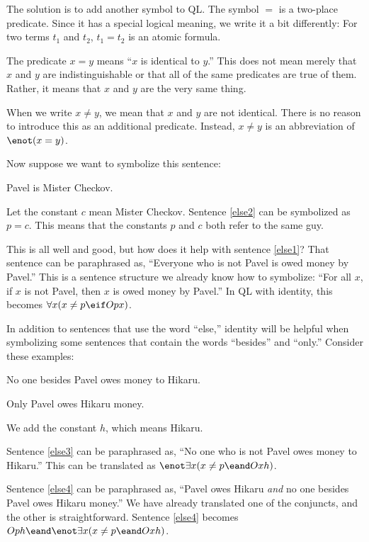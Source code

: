 The solution is to add another symbol to QL. The symbol $=$ is a two-place predicate. Since it has a special logical meaning, we write it a bit differently: For two terms $t_1$ and $t_2$, $t_1=t_2$ is an atomic formula.

The predicate $x=y$ means ``$x$ is identical to $y$.'' This does not mean merely that $x$ and $y$ are indistinguishable or that all of the same predicates are true of them. Rather, it means that $x$ and $y$ are the very same thing.

When we write $x \neq y$, we mean that $x$ and $y$ are not identical. There is no reason to introduce this as an additional predicate. Instead, $x \neq y$ is an abbreviation of $\enot(x = y)$.

Now suppose we want to symbolize this sentence:
\begin{kormanize}
\item[\ex{else2}] Pavel is Mister Checkov.
\end{kormanize}
Let the constant $c$ mean Mister Checkov. Sentence \ref{else2} can be symbolized as $p=c$. This means that the constants $p$ and $c$ both refer to the same guy.

This is all well and good, but how does it help with sentence \ref{else1}? That sentence can be paraphrased as, ``Everyone who is not Pavel is owed money by Pavel.'' This is a sentence structure we already know how to symbolize: ``For all $x$, if $x$ is not Pavel, then $x$ is owed money by Pavel.'' In QL with identity, this becomes $\forall x (x\neq p \eif Opx)$.

In addition to sentences that use the word ``else,'' identity will be helpful when symbolizing some sentences that contain the words ``besides'' and ``only.'' Consider these examples:

\begin{kormanize}
\item[\ex{else3}] No one besides Pavel owes money to Hikaru.
\item[\ex{else4}] Only Pavel owes Hikaru money.
\end{kormanize}

We add the constant $h$, which means Hikaru.

Sentence \ref{else3} can be paraphrased as, ``No one who is not Pavel owes money to Hikaru.'' This can be translated as $\enot\exists x(x\neq p \eand Oxh)$.

Sentence \ref{else4} can be paraphrased as, ``Pavel owes Hikaru \emph{and} no one besides Pavel owes Hikaru money.'' We have already translated one of the conjuncts, and the other is straightforward. Sentence \ref{else4} becomes $Oph \eand \enot\exists x(x\neq p \eand Oxh)$.


